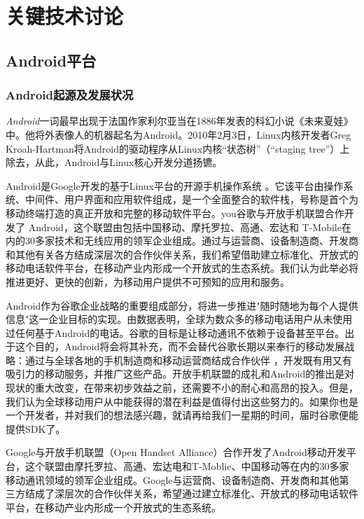 \documentclass{XDBAthesis}
\begin{document}
\else
\fi
\chapter{关键技术讨论}

\section{Android平台}

\subsection{Android起源及发展状况}

\emph{Android}一词最早出现于法国作家利尔亚当在1886年发表的科幻小说《未来夏娃》中。他将外表像人的机器起名为Android。2010年2月3日，Linux内核开发者Greg Kroah-Hartman将Android的驱动程序从Linux内核“状态树”（“staging tree”）上除去，从此，Android与Linux核心开发分道扬镳。

Android是Google开发的基于Linux平台的开源手机操作系统\cite{单李旺2009android} 。它该平台由操作系统、中间件、用户界面和应用软件组成，是一个全面整合的软件栈，号称是首个为移动终端打造的真正开放和完整的移动软件平台。you谷歌与开放手机联盟合作开发了 Android，这个联盟由包括中国移动、摩托罗拉、高通、宏达和 T-Mobile在内的30多家技术和无线应用的领军企业组成。通过与运营商、设备制造商、开发商和其他有关各方结成深层次的合作伙伴关系，我们希望借助建立标准化、开放式的移动电话软件平台，在移动产业内形成一个开放式的生态系统。我们认为此举必将推进更好、更快的创新，为移动用户提供不可预知的应用和服务。

Android作为谷歌企业战略的重要组成部分，将进一步推进"随时随地为每个人提供信息"这一企业目标的实现。由数据表明，全球为数众多的移动电话用户从未使用过任何基于Android的电话。谷歌的目标是让移动通讯不依赖于设备甚至平台。出于这个目的，Android将会将其补充，而不会替代谷歌长期以来奉行的移动发展战略：通过与全球各地的手机制造商和移动运营商结成合作伙伴\cite{罗翔2010symbian} ，开发既有用又有吸引力的移动服务，并推广这些产品。开放手机联盟的成礼和Android的推出是对现状的重大改变，在带来初步效益之前，还需要不小的耐心和高昂的投入。但是，我们认为全球移动用户从中能获得的潜在利益是值得付出这些努力的。如果你也是一个开发者，并对我们的想法感兴趣，就请再给我们一星期的时间，届时谷歌便能提供SDK了。

Google与开放手机联盟（Open Handset Alliance）合作开发了Android移动开发平台，这个联盟由摩托罗拉、高通、宏达电和T-Moblie、中国移动等在内的30多家移动通讯领域的领军企业组成。Google与运营商、设备制造商、开发商和其他第三方结成了深层次的合作伙伴关系，希望通过建立标准化、开放式的移动电话软件平台，在移动产业内形成一个开放式的生态系统。    
\end{document}
